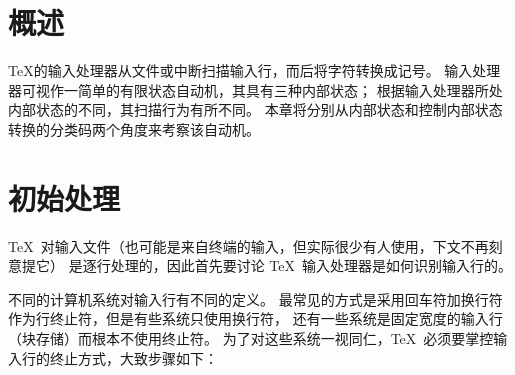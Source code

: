 \documentclass{book}
\begin{document}
\section{概述}

\TeX 的输入处理器从文件或中断扫描输入行，而后将字符转换成记号。
输入处理器可视作一简单的有限状态自动机，其具有三种内部状态；
根据输入处理器所处内部状态的不同，其扫描行为有所不同。
本章将分别从内部状态和控制内部状态转换的分类码两个角度来考察该自动机。

\section{初始处理}

\TeX\ 对输入文件（也可能是来自终端的输入，但实际很少有人使用，下文不再刻意提它）%
是逐行处理的，因此首先要讨论 \TeX\ 输入处理器是如何识别输入行的。

不同的计算机系统对输入行有不同的定义。
最常见的方式是采用回车符加换行符作为行终止符，但是有些系统只使用换行符，
还有一些系统是固定宽度的输入行（块存储）而根本不使用终止符。
为了对这些系统一视同仁，\TeX\ 必须要掌控输入行的终止方式，大致步骤如下：
\end{document}
